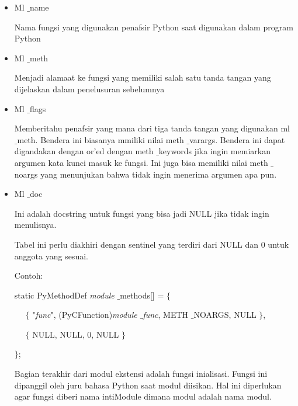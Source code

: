 \documentclass[a4paper,12pt]{report}
\begin{document}
\begin{itemize}
\item Ml $  \_  $name \par
Nama fungsi yang digunakan penafsir Python saat digunakan dalam program Python \par
\noindent 
\item Ml $  \_  $meth \par
Menjadi alamaat ke fungsi yang memiliki salah satu tanda tangan yang dijelaskan dalam penelusuran sebelumnya \par
\noindent 
\item Ml $  \_  $flags \par
Memberitahu penafsir yang mana dari tiga tanda tangan yang digunakan ml $  \_  $meth. Bendera ini biasanya mmiliki nilai meth $  \_  $varargs. Bendera ini dapat digandakan dengan or’ed dengan meth $  \_  $keywords jika ingin memiarkan argumen kata kunci masuk ke fungsi. Ini juga bisa memiliki nilai meth $  \_  $noargs yang menunjukan bahwa tidak ingin menerima argumen apa pun. \par
\noindent 
\item Ml $  \_  $doc \par
Ini adalah docstring untuk fungsi yang bisa jadi NULL jika tidak ingin menulisnya. \par
\vspace{12pt}
\vspace{12pt}
\noindent 
 \hspace*{0.5in} Tabel ini perlu diakhiri dengan sentinel yang terdiri dari NULL dan 0 untuk anggota yang sesuai. \par
\vspace{12pt}
\noindent 
Contoh: \par
\noindent 
static PyMethodDef \textit{module} $  \_  $methods[] =  $  \{  $ \par
\noindent 
~~  $  \{  $ "\textit{func}", (PyCFunction)\textit{module $  \_  $func}, METH $  \_  $NOARGS, NULL  $  \}  $, \par
\noindent 
~~  $  \{  $ NULL, NULL, 0, NULL  $  \}  $ \par
\noindent 
 $  \}  $; \par
\vspace{12pt}
\noindent 
 \hspace*{0.5in} Bagian terakhir dari modul ekstensi adalah fungsi inialisasi. Fungsi ini dipanggil oleh juru bahasa Python saat modul diisikan. Hal ini diperlukan agar fungsi diberi nama intiModule dimana modul adalah nama modul. \par

\end{itemize}
\end{document}
